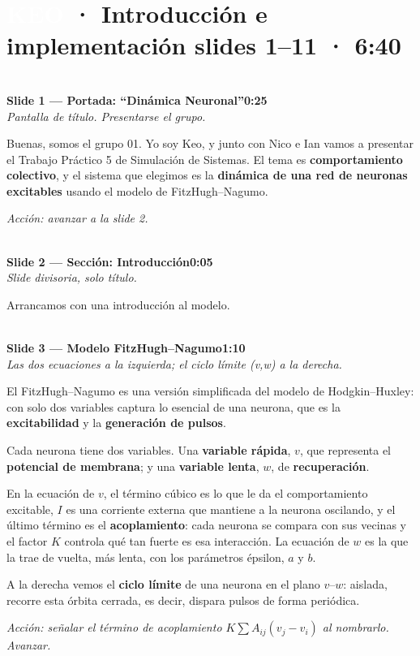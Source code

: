 \documentclass[11pt]{article}
\newcommand{\slide}[3]{%
  \vspace{6pt}%
  \noindent{\color{azulOscuro}\rule{3.2cm}{2pt}}\\[2pt]
  \noindent\textbf{\color{azulOscuro}#1}\hfill\textbf{\color{azulMedio}#3}\\[-2pt]
  {\small\color{grisTexto}\itshape #2}\\[2pt]
}
\newcommand{\quien}[2]{\noindent\colorbox{#1}{\textcolor{white}{\textbf{\;#2\;}}}}
\begin{document}
\section{\quien{keoColor}{KEO} · Introducción e implementación \hfill\normalsize\mdseries slides 1--11 · 6:40}

\slide{Slide 1 — Portada: ``Dinámica Neuronal''}{Pantalla de título. Presentarse el grupo.}{0:25}
\begin{guion}
Buenas, somos el grupo 01. Yo soy Keo, y junto con Nico e Ian vamos a presentar el Trabajo Práctico 5 de Simulación de Sistemas. El tema es \textbf{comportamiento colectivo}, y el sistema que elegimos es la \textbf{dinámica de una red de neuronas excitables} usando el modelo de FitzHugh--Nagumo.
\end{guion}
\textit{Acción: avanzar a la slide 2.}

\slide{Slide 2 — Sección: Introducción}{Slide divisoria, solo título.}{0:05}
\begin{guion}
Arrancamos con una introducción al modelo.
\end{guion}

\slide{Slide 3 — Modelo FitzHugh--Nagumo}{Las dos ecuaciones a la izquierda; el ciclo límite (v,w) a la derecha.}{1:10}
\begin{guion}
El FitzHugh--Nagumo es una versión simplificada del modelo de Hodgkin--Huxley: con solo dos variables captura lo esencial de una neurona, que es la \textbf{excitabilidad} y la \textbf{generación de pulsos}.

Cada neurona tiene dos variables. Una \textbf{variable rápida}, $v$, que representa el \textbf{potencial de membrana}; y una \textbf{variable lenta}, $w$, de \textbf{recuperación}.

En la ecuación de $v$, el término cúbico es lo que le da el comportamiento excitable, $I$ es una corriente externa que mantiene a la neurona oscilando, y el último término es el \textbf{acoplamiento}: cada neurona se compara con sus vecinas y el factor $K$ controla qué tan fuerte es esa interacción. La ecuación de $w$ es la que la trae de vuelta, más lenta, con los parámetros épsilon, $a$ y $b$.

A la derecha vemos el \textbf{ciclo límite} de una neurona en el plano $v$--$w$: aislada, recorre esta órbita cerrada, es decir, dispara pulsos de forma periódica.
\end{guion}
\textit{Acción: señalar el término de acoplamiento $K\sum A_{ij}(v_j-v_i)$ al nombrarlo. Avanzar.}
\end{document}
